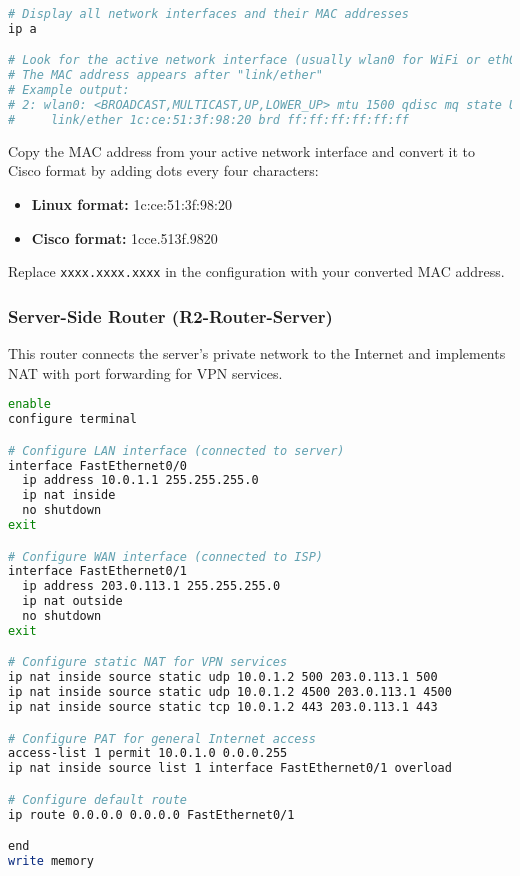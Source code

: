 \begin{lstlisting}[language=bash]
# Display all network interfaces and their MAC addresses
ip a

# Look for the active network interface (usually wlan0 for WiFi or eth0 for Ethernet)
# The MAC address appears after "link/ether"
# Example output:
# 2: wlan0: <BROADCAST,MULTICAST,UP,LOWER_UP> mtu 1500 qdisc mq state UP group default qlen 1000
#     link/ether 1c:ce:51:3f:98:20 brd ff:ff:ff:ff:ff:ff
\end{lstlisting}

\noindent
Copy the MAC address from your active network interface and convert it to Cisco format by adding dots every four characters:
\begin{itemize}
    \item \textbf{Linux format:} 1c:ce:51:3f:98:20
    \item \textbf{Cisco format:} 1cce.513f.9820
\end{itemize}

Replace \texttt{xxxx.xxxx.xxxx} in the configuration with your converted MAC address.

\subsubsection{Server-Side Router (R2-Router-Server)}

This router connects the server's private network to the Internet and implements NAT with port forwarding for VPN services.

\begin{lstlisting}[language=bash]
enable
configure terminal

# Configure LAN interface (connected to server)
interface FastEthernet0/0
  ip address 10.0.1.1 255.255.255.0
  ip nat inside
  no shutdown
exit

# Configure WAN interface (connected to ISP)
interface FastEthernet0/1
  ip address 203.0.113.1 255.255.255.0
  ip nat outside
  no shutdown
exit

# Configure static NAT for VPN services
ip nat inside source static udp 10.0.1.2 500 203.0.113.1 500
ip nat inside source static udp 10.0.1.2 4500 203.0.113.1 4500
ip nat inside source static tcp 10.0.1.2 443 203.0.113.1 443

# Configure PAT for general Internet access
access-list 1 permit 10.0.1.0 0.0.0.255
ip nat inside source list 1 interface FastEthernet0/1 overload

# Configure default route
ip route 0.0.0.0 0.0.0.0 FastEthernet0/1

end
write memory
\end{lstlisting}

